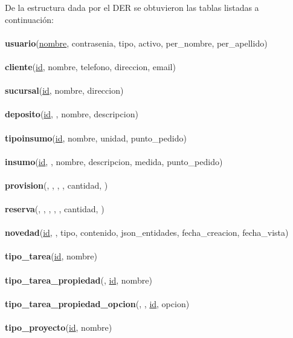 \documentclass[a4paper, 12pt,twoside]{report}  %
\numberwithin{equation}{subsection} %
\begin{document}
De la estructura dada por el DER se obtuvieron las tablas listadas a continuación:
\\\\
\noindent\textbf{usuario}(\underline{nombre}, contrasenia, tipo, activo, per\_nombre, per\_apellido)
\\\\
\textbf{cliente}(\underline{id}, nombre, telefono, direccion, email)
\\\\
\textbf{sucursal}(\underline{id}, nombre, direccion)
\\\\
\textbf{deposito}(\underline{id}, \underline{}, nombre, descripcion)
\\\\
\textbf{tipo\-insumo}(\underline{id}, nombre, unidad, punto\_pedido)
\\\\
\textbf{insumo}(\underline{id}, \underline{}, nombre, descripcion, medida, punto\_pedido)
\\\\
\textbf{provision}(\underline{}, \underline{}, \underline{}, \underline{}, cantidad, \underline{})
\\\\
\textbf{reserva}(\underline{}, \underline{}, \underline{}, \underline{}, \underline{}, cantidad, \underline{})
\\\\
\textbf{novedad}(\underline{id}, , tipo, contenido, json\_entidades, fecha\_creacion, fecha\_vista)
\\\\
\textbf{tipo\_tarea}(\underline{id}, nombre)
\\\\
\textbf{tipo\_tarea\_propiedad}(\underline{}, \underline{id}, nombre)
\\\\
\textbf{tipo\_tarea\_propiedad\_opcion}(\underline{}, \underline{}, \underline{id}, opcion)
\\\\
\textbf{tipo\_proyecto}(\underline{id}, nombre)
\end{document}
